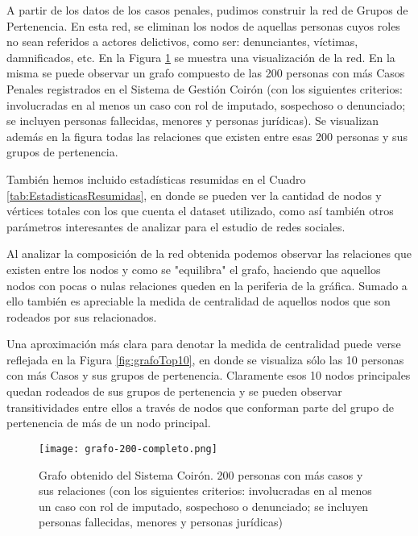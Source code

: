 A partir de los datos de los casos penales, pudimos
construir la red de Grupos de Pertenencia. En esta red, se eliminan los nodos de aquellas personas cuyos roles no sean referidos a actores delictivos, como ser: denunciantes, víctimas, damnificados, etc. En la Figura \ref{fig:grafocompleto} se muestra una visualización de la red. En la misma se puede observar un grafo compuesto de las 200 personas con más Casos Penales registrados en el Sistema de Gestión Coirón (con los siguientes criterios: involucradas en al menos un caso con rol de imputado, sospechoso o denunciado; se incluyen personas fallecidas, menores y personas jurídicas). Se visualizan además en la figura todas las relaciones que existen entre esas 200 personas y sus grupos de pertenencia.

También hemos incluido estadísticas resumidas en el Cuadro  \ref{tab:EstadisticasResumidas}, en donde se pueden ver la cantidad de nodos y vértices totales con los que cuenta el dataset utilizado, como así también otros parámetros interesantes de analizar para el estudio de redes sociales.

Al analizar la composición de la red obtenida podemos observar las relaciones que existen entre los nodos y como se "equilibra" el grafo, haciendo que aquellos nodos con pocas o nulas relaciones queden en la periferia de la gráfica. Sumado a ello también es apreciable la medida de centralidad de aquellos nodos que son rodeados por sus relacionados.

Una aproximación más clara para denotar la medida de centralidad puede verse reflejada en la Figura \ref{fig:grafoTop10}, en donde se visualiza sólo las 10 personas con más Casos y sus grupos de pertenencia. Claramente esos 10 nodos principales quedan rodeados de sus grupos de pertenencia y se pueden observar transitividades entre ellos a través de nodos que conforman parte del grupo de pertenencia de más de un nodo principal.



\begin{figure}
	\centering
	\texttt{[image: grafo-200-completo.png]}
	\caption{Grafo obtenido del Sistema Coirón. 200 personas con más casos y sus relaciones (con los siguientes criterios: involucradas en al menos un caso con rol de imputado, sospechoso o denunciado; se incluyen personas fallecidas, menores y personas jurídicas)} 
	\label{fig:grafocompleto}
\end{figure}


